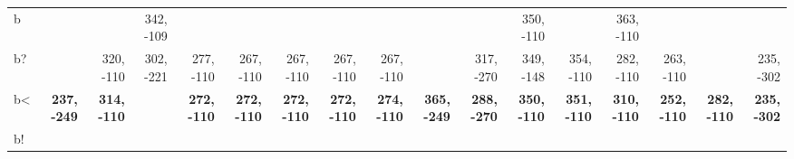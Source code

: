 \begin{table}[p]
{\begin{tabular}{lrrrrrrrrrrrrrrrr}
b &  &  & 342, -109 &  &  &  &  &  &  &  & 350, -110 &  & 363, -110 &  &  &  \\
b? &  & 320, -110 & 302, -221 & 277, -110 & 267, -110 & 267, -110 & 267, -110 & 267, -110 &  & 317, -270 & 349, -148 & 354, -110 & 282, -110 & 263, -110 &  & 235, -302 \\
b< & \textbf{237, -249} & \textbf{314, -110} &  & \textbf{272, -110} & \textbf{272, -110} & \textbf{272, -110} & \textbf{272, -110} & \textbf{274, -110} & \textbf{365, -249} & \textbf{288, -270} & \textbf{350, -110} & \textbf{351, -110} & \textbf{310, -110} & \textbf{252, -110} & \textbf{282, -110} & \textbf{235, -302} \\
b! &  &  &  &  &  &  &  &  &  &  &  &  &  &  &  &  \\

\end{tabular}
}
\end{table}
\clearpage


